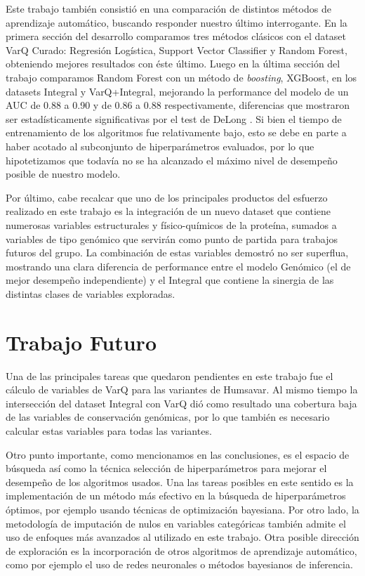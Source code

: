 Este trabajo también consistió en una comparación de distintos métodos de aprendizaje automático, buscando responder nuestro último interrogante. En la primera sección del desarrollo comparamos tres métodos clásicos con el dataset VarQ Curado: Regresión Logística, Support Vector Classifier y Random Forest, obteniendo mejores resultados con éste último. Luego en la última sección del trabajo comparamos Random Forest con un método de \textit{boosting}, XGBoost, en los datasets Integral y VarQ+Integral, mejorando la performance del modelo de un AUC de 0.88 a 0.90 y de 0.86 a 0.88 respectivamente, diferencias que mostraron ser estadísticamente significativas por el test de DeLong \cite{DeLong}. Si bien el tiempo de entrenamiento de los algoritmos fue relativamente bajo, esto se debe en parte  a haber acotado al subconjunto de hiperparámetros evaluados, por lo que hipotetizamos que todavía no se ha alcanzado el máximo nivel de desempeño posible de nuestro modelo.  

Por último, cabe recalcar que uno de los principales productos del esfuerzo realizado en este trabajo es la integración de un nuevo dataset que contiene numerosas variables estructurales y físico-químicos de la proteína, sumados a variables de tipo genómico que servirán como punto de partida para trabajos futuros del grupo. La combinación de estas variables demostró no ser superflua, mostrando una clara diferencia de performance entre el modelo Genómico (el de mejor desempeño independiente) y el Integral que contiene la sinergia de las distintas clases de variables exploradas.

\section{Trabajo Futuro}

Una de las principales tareas que quedaron pendientes en este trabajo fue el cálculo de variables de VarQ para las variantes de Humsavar. Al mismo tiempo la intersección del dataset Integral con VarQ dió como resultado una cobertura baja de las variables de conservación genómicas, por lo que también es necesario calcular estas variables para todas las variantes. 

Otro punto importante, como mencionamos en las conclusiones, es el espacio de búsqueda así como la técnica selección de hiperparámetros para mejorar el desempeño de  los algoritmos usados. Una las tareas posibles en este sentido es la implementación de un método más efectivo en la búsqueda de hiperparámetros óptimos, por ejemplo usando técnicas de optimización bayesiana. Por otro lado, la metodología de imputación de nulos en variables categóricas también admite el uso de enfoques más avanzados al utilizado en este trabajo. Otra posible dirección de exploración es la incorporación  de otros algoritmos de aprendizaje automático, como por ejemplo el uso de redes neuronales o métodos bayesianos de inferencia. 

